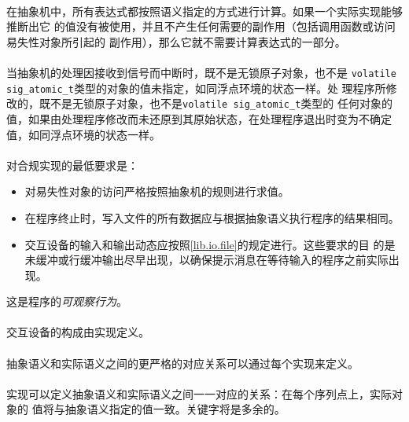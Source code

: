 \paragraph{}
在抽象机中，所有表达式都按照语义指定的方式进行计算。如果一个实际实现能够推断出它
的值没有被使用，并且不产生任何需要的副作用（包括调用函数或访问易失性对象所引起的
副作用），那么它就不需要计算表达式的一部分。

\paragraph{}
当抽象机的处理因接收到信号而中断时，既不是无锁原子对象，也不是
\texttt{volatile sig\_atomic\_t}类型的对象的值未指定，如同浮点环境的状态一样。处
理程序所修改的，既不是无锁原子对象，也不是\texttt{volatile sig\_atomic\_t}类型的
任何对象的值，如果由处理程序修改而未还原到其原始状态，在处理程序退出时变为不确定
值，如同浮点环境的状态一样。

\paragraph{}
对合规实现的最低要求是：
\begin{itemize}
  \item{对易失性对象的访问严格按照抽象机的规则进行求值。}
  \item{在程序终止时，写入文件的所有数据应与根据抽象语义执行程序的结果相同。}
  \item{交互设备的输入和输出动态应按照\ref{lib.io.file}的规定进行。这些要求的目
  的是未缓冲或行缓冲输出尽早出现，以确保提示消息在等待输入的程序之前实际出现。}
\end{itemize}
这是程序的\textit{可观察行为}。

\paragraph{}
交互设备的构成由实现定义。

\paragraph{}
抽象语义和实际语义之间的更严格的对应关系可以通过每个实现来定义。

\paragraph{}
\ex 实现可以定义抽象语义和实际语义之间一一对应的关系：在每个序列点上，实际对象的
值将与抽象语义指定的值一致。关键字将是多余的。

